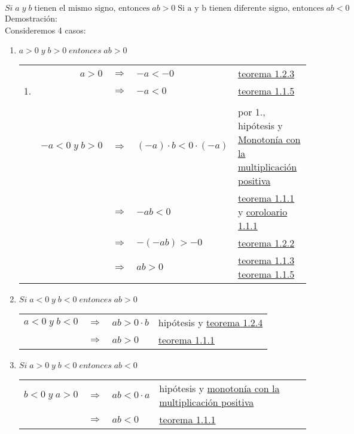 \begin{teo}
$Si \; a \; y \; b \; \mbox{tienen el mismo signo, entonces} \; ab>0 \; \mbox{Si a y b tienen diferente signo, entonces}\; ab < 0$\\ \label{teo 1.2.7}
Demostración:\\
Consideremos 4 casos:
\begin{enumerate}[C1.-]
\item $a > 0 \; y \; b > 0 \; entonces \; ab > 0$
\begin{center}
\begin{tabular}{c r c l l}
&$a>0$&$\Rightarrow$&$-a<-0$&\hyperref[teo 1.2.3]{teorema 1.2.3 }\\
1.&&$\Rightarrow$&$-a<0$&\hyperref[teo 1.1.5]{teorema 1.1.5}\\\\
&$-a<0 \; y \; b>0$&$\Rightarrow$&$(-a)\cdot b<0 \cdot (-a) $&por 1., hipótesis y \hyperref[O4]{Monotonía con la multiplicación positiva}\\
&&$\Rightarrow$&$-ab < 0$&\hyperref[teo 1.1.1]{teorema 1.1.1} y \hyperref[cor 1.1.1]{coroloario 1.1.1}\\
&&$\Rightarrow$&$-(-ab)>-0$&\hyperref[teo 1.2.2]{teorema 1.2.2}\\
&&$\Rightarrow$&$ab>0$&\hyperref[teo 1.1.3]{teorema 1.1.3} \hyperref[teo 1.1.5]{teorema 1.1.5}\\
\end{tabular}
\end{center}

\item $Si \; a<0 \; y \; b<0 \; entonces \; ab>0$
\begin{center}
\begin{tabular}{r c l l}
$a<0 \; y \; b<0$&$\Rightarrow$&$ab > 0 \cdot b$&hipótesis y \hyperref[teo 1.2.4]{teorema 1.2.4}\\
&$\Rightarrow$&$ab>0$&\hyperref[teo 1.1.1]{teorema 1.1.1}\\
\end{tabular}
\end{center}

\item $Si \; a>0 \; y \; b<0 \; entonces \; ab<0$ 
\begin{center}
\begin{tabular}{r c l l}
$b<0 \; y \; a>0$&$\Rightarrow$&$ab<0\cdot a$&hipótesis y \hyperref[O4]{monotonía con la multiplicación positiva}\\
&$\Rightarrow$&$ab<0$&\hyperref[teo 1.1.1]{teorema 1.1.1}\\
\end{tabular}
\end{center}


\end{enumerate}
\end{teo}
